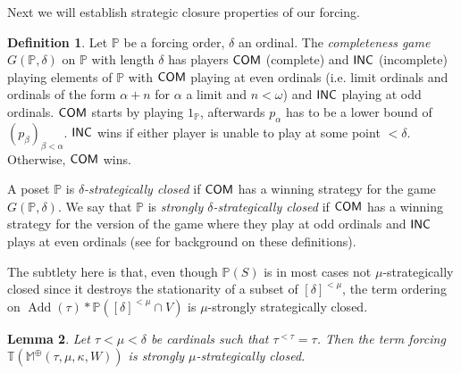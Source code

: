 \documentclass[a4paper]{amsart}
\theoremstyle{definition}
\newtheorem{mydef}{Definition}[section]
\theoremstyle{remark}
\theoremstyle{plain}
\newtheorem{mylem}[mydef]{Lemma}
\newtheorem{myfact}[mydef]{Fact}
\numberwithin{mydef}{section}
\DeclareMathOperator{\Add}{Add}
\newcommand{\dM}{\mathbb{M}}
\newcommand{\dP}{\mathbb{P}}
\newcommand{\dT}{\mathbb{T}}
\newcommand{\COM}{\textsf{\textup{COM}}}
\newcommand{\INC}{\textsf{\textup{INC}}}
\begin{document}
Next we will establish strategic closure properties of our forcing.
	
	\begin{mydef}
		Let $\dP$ be a forcing order, $\delta$ an ordinal. The \emph{completeness game} $G(\dP,\delta)$ on $\dP$ with length $\delta$ has players $\COM$ (complete) and $\INC$ (incomplete) playing elements of $\dP$ with $\COM$ playing at even ordinals (i.e$.$ limit ordinals and ordinals of the form $\alpha+n$ for $\alpha$ a limit and $n<\omega$) and $\INC$ playing at odd ordinals. $\COM$ starts by playing $1_{\dP}$, afterwards $p_{\alpha}$ has to be a lower bound of $(p_{\beta})_{\beta<\alpha}$. $\INC$ wins if either player is unable to play at some point $<\delta$. Otherwise, $\COM$ wins.
		
	A poset $\dP$ is \emph{$\delta$-strategically closed} if $\COM$ has a winning strategy for the game $G(\dP,\delta)$. We say that $\dP$ is \emph{strongly $\delta$-strategically closed} if $\COM$ has a winning strategy for the version of the game where they play at odd ordinals and $\INC$ plays at even ordinals (see \cite{Handbook-Cummings} for background on these definitions).
	\end{mydef}
	
	


		
		The subtlety here is that, even though $\dP(S)$ is in most cases not $\mu$-strategically closed since it destroys the stationarity of a subset of $[\delta]^{<\mu}$, the term ordering on $\Add(\tau)*\dP([\delta]^{<\mu}\cap V)$ is $\mu$-strongly strategically closed.


	\begin{mylem}\label{StratClosed}
		Let $\tau<\mu<\delta$ be cardinals such that $\tau^{<\tau}=\tau$. Then the term forcing $\dT(\dM^\oplus(\tau,\mu,\kappa,W))$ is strongly $\mu$-strategically closed.
	\end{mylem}

	
\end{document}
